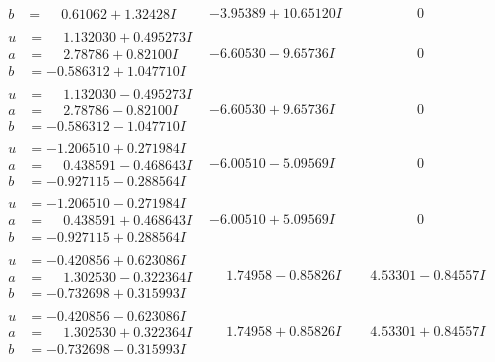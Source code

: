 \documentclass[1p]{elsarticle_modified}
\theoremstyle{definition}
\begin{document}
$$\begin{array}{c|c|c}
\begin{aligned}
b &= \phantom{-}0.61062 + 1.32428 I\end{aligned}
 & -3.95389 + 10.65120 I & \phantom{-0.000000 } 0 \\ \hline\begin{aligned}
u &= \phantom{-}1.132030 + 0.495273 I \\
a &= \phantom{-}2.78786 + 0.82100 I \\
b &= -0.586312 + 1.047710 I\end{aligned}
 & -6.60530 - 9.65736 I & \phantom{-0.000000 } 0 \\ \hline\begin{aligned}
u &= \phantom{-}1.132030 - 0.495273 I \\
a &= \phantom{-}2.78786 - 0.82100 I \\
b &= -0.586312 - 1.047710 I\end{aligned}
 & -6.60530 + 9.65736 I & \phantom{-0.000000 } 0 \\ \hline\begin{aligned}
u &= -1.206510 + 0.271984 I \\
a &= \phantom{-}0.438591 - 0.468643 I \\
b &= -0.927115 - 0.288564 I\end{aligned}
 & -6.00510 - 5.09569 I & \phantom{-0.000000 } 0 \\ \hline\begin{aligned}
u &= -1.206510 - 0.271984 I \\
a &= \phantom{-}0.438591 + 0.468643 I \\
b &= -0.927115 + 0.288564 I\end{aligned}
 & -6.00510 + 5.09569 I & \phantom{-0.000000 } 0 \\ \hline\begin{aligned}
u &= -0.420856 + 0.623086 I \\
a &= \phantom{-}1.302530 - 0.322364 I \\
b &= -0.732698 + 0.315993 I\end{aligned}
 & \phantom{-}1.74958 - 0.85826 I & \phantom{-}4.53301 - 0.84557 I \\ \hline\begin{aligned}
u &= -0.420856 - 0.623086 I \\
a &= \phantom{-}1.302530 + 0.322364 I \\
b &= -0.732698 - 0.315993 I\end{aligned}
 & \phantom{-}1.74958 + 0.85826 I & \phantom{-}4.53301 + 0.84557 I \\ \hline\begin{aligned}

\end{aligned}
\end{array}$$
\end{document}
